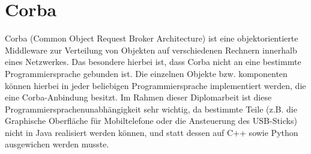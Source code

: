 \section{Corba}
    Corba (Common Object Request Broker Architecture) ist eine objektorientierte Middleware zur Verteilung von 
    Objekten auf verschiedenen Rechnern innerhalb eines Netzwerkes. Das besondere hierbei ist, dass Corba
    nicht an eine bestimmte Programmiersprache gebunden ist. Die einzelnen Objekte bzw. komponenten können
    hierbei in jeder beliebigen Programmiersprache implementiert werden, die eine Corba-Anbindung besitzt.
    Im Rahmen dieser Diplomarbeit ist diese Programmiersprachenunabhängigkeit sehr wichtig, da bestimmte
    Teile (z.B. die Graphische Oberfläche für Mobiltelefone oder die Ansteuerung des USB-Sticks) nicht in 
    Java realisiert werden können, und statt dessen auf C++ sowie Python ausgewichen werden musste.
